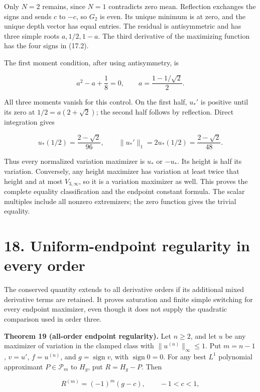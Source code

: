\documentclass[11pt]{article}
\begin{document}
Only \(N=2\) remains, since \(N=1\) contradicts zero mean. Reflection
exchanges the signs and sends \(c\) to \(-c\), so \(G_2\) is even. Its
unique minimum is at zero, and the unique depth vector has equal
entries. The residual is antisymmetric and has three simple roots
\(a,1/2,1-a\). The third derivative of the maximizing function has the
four signs in (17.2).

The first moment condition, after using antisymmetry, is

\[
a^2-a+\frac18=0,
\qquad a=\frac{1-1/\sqrt2}{2}.
\tag{17.13}
\]

All three moments vanish for this control. On the first half, \(u_*'\)
is positive until its zero at \(1/2=a(2+\sqrt2)\); the second half
follows by reflection. Direct integration gives

\[
u_*(1/2)=\frac{2-\sqrt2}{96},\qquad
\|u_*'\|_1=2u_*(1/2)=\frac{2-\sqrt2}{48}.
\tag{17.14}
\]

Thus every normalized variation maximizer is \(u_*\) or \(-u_*\). Its
height is half its variation. Conversely, any height maximizer has
variation at least twice that height and at most \(V_{3,\infty}\), so it
is a variation maximizer as well. This proves the complete equality
classification and the endpoint constant formula. The scalar multiples
include all nonzero extremizers; the zero function gives the trivial
equality.

\section{18. Uniform-endpoint regularity in every
order}\label{uniform-endpoint-regularity-in-every-order}

The conserved quantity extends to all derivative orders if its
additional mixed derivative terms are retained. It proves saturation and
finite simple switching for every endpoint maximizer, even though it
does not supply the quadratic comparison used in order three.

\textbf{Theorem 19 (all-order endpoint regularity).} Let \(n\ge2\), and
let \(u\) be any maximizer of variation in the clamped class with
\(\|u^{(n)}\|_\infty\le1\). Put \(m=n-1\), \(v=u'\), \(f=u^{(n)}\), and
\(g=\operatorname{sign}v\), with \(\operatorname{sign}0=0\). For any
best \(L^1\) polynomial approximant \(P\in\mathcal P_m\) to \(H_g\), put
\(R=H_g-P\). Then

\[
R^{(m)}=(-1)^m(g-c),\qquad -1<c<1,
\tag{18.1}
\]
\end{document}

